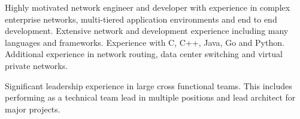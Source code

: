 Highly motivated network engineer and developer with experience in complex
enterprise networks, multi-tiered application environments and end to end
development. Extensive network and development experience including many
languages and frameworks. Experience with C, C++, Java, Go and Python.
Additional experience in network routing, data center switching and virtual
private networks.

Significant leadership experience in large cross functional teams. This
includes performing as a technical team lead in multiple positions and lead
architect for major projects.

